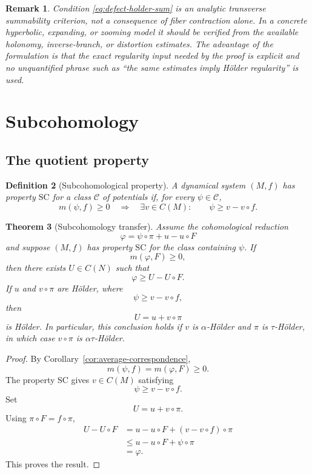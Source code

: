 \documentclass[11pt,a4paper]{article}
\newtheorem{theorem}{Theorem}[section]
\newtheorem{remark}[theorem]{Remark}
\newtheorem{definition}[theorem]{Definition}
\begin{document}
\begin{remark}
Condition \eqref{eq:defect-holder-sum} is an analytic transverse
summability criterion, not a consequence of fiber contraction alone. In a
concrete hyperbolic, expanding, or zooming model it should be verified from
the available holonomy, inverse-branch, or distortion estimates. The
advantage of the formulation is that the exact regularity input needed by
the proof is explicit and no unquantified phrase such as ``the same
estimates imply H\"older regularity'' is used.
\end{remark}

\section{Subcohomology}

\subsection{The quotient property}

\begin{definition}[Subcohomological property]
A dynamical system $(M,f)$ has property $\mathrm{SC}$ for a class
$\mathcal C$ of potentials if, for every $\psi\in\mathcal C$,
\[
m(\psi,f)\geq0
\quad\Longrightarrow\quad
\exists v\in C(M):
\qquad
\psi\geq v-v\circ f.
\]
\end{definition}

\begin{theorem}[Subcohomology transfer]
\label{thm:SC-transfer}
Assume the cohomological reduction
\[
\varphi=\psi\circ\pi+u-u\circ F
\]
and suppose $(M,f)$ has property $\mathrm{SC}$ for the class containing
$\psi$. If
\[
m(\varphi,F)\geq0,
\]
then there exists $U\in C(N)$ such that
\[
\boxed{\varphi\geq U-U\circ F.}
\]
If $u$ and $v\circ\pi$ are H\"older, where
\[
\psi\geq v-v\circ f,
\]
then
\[
U=u+v\circ\pi
\]
is H\"older. In particular, this conclusion holds if $v$ is
$\alpha$-H\"older and $\pi$ is $\tau$-H\"older, in which case
$v\circ\pi$ is $\alpha\tau$-H\"older.
\end{theorem}

\begin{proof}
By Corollary~\ref{cor:average-correspondence},
\[
m(\psi,f)=m(\varphi,F)\geq0.
\]
The property $\mathrm{SC}$ gives $v\in C(M)$ satisfying
\[
\psi\geq v-v\circ f.
\]
Set
\[
U=u+v\circ\pi.
\]
Using $\pi\circ F=f\circ\pi$,
\begin{align}
U-U\circ F
&=
u-u\circ F
+
(v-v\circ f)\circ\pi\\
&\leq
u-u\circ F+\psi\circ\pi\\
&=\varphi.
\end{align}
This proves the result.
\end{proof}
\end{document}
